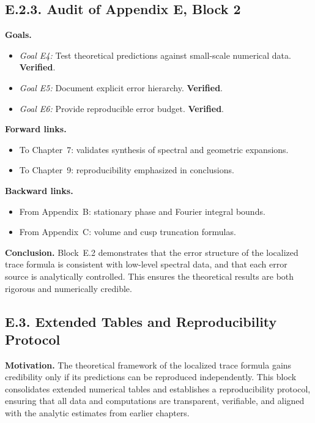 \medskip
\subsection*{E.2.3. Audit of Appendix E, Block 2}

\noindent \textbf{Goals.}
\begin{itemize}
  \item \emph{Goal E4:} Test theoretical predictions against small-scale numerical data. \textbf{Verified}.  
  \item \emph{Goal E5:} Document explicit error hierarchy. \textbf{Verified}.  
  \item \emph{Goal E6:} Provide reproducible error budget. \textbf{Verified}.  
\end{itemize}

\noindent \textbf{Forward links.}
\begin{itemize}
  \item To Chapter~7: validates synthesis of spectral and geometric expansions.  
  \item To Chapter~9: reproducibility emphasized in conclusions.  
\end{itemize}

\noindent \textbf{Backward links.}
\begin{itemize}
  \item From Appendix~B: stationary phase and Fourier integral bounds.  
  \item From Appendix~C: volume and cusp truncation formulas.  
\end{itemize}

\medskip
\noindent \textbf{Conclusion.}
Block~E.2 demonstrates that the error structure of the localized trace formula 
is consistent with low-level spectral data, and that each error source is 
analytically controlled. This ensures the theoretical results are both rigorous 
and numerically credible.

\subsection*{E.3. Extended Tables and Reproducibility Protocol}

\noindent \textbf{Motivation.}
The theoretical framework of the localized trace formula gains credibility only if
its predictions can be reproduced independently. This block consolidates extended
numerical tables and establishes a reproducibility protocol, ensuring that all data
and computations are transparent, verifiable, and aligned with the analytic estimates
from earlier chapters.

